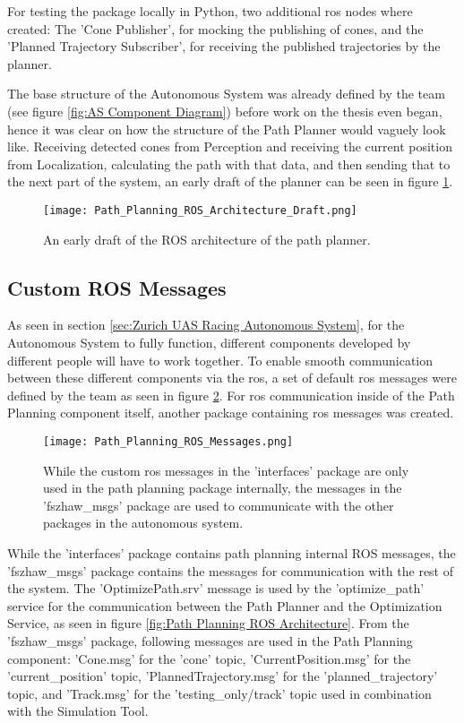 For testing the package locally in Python, two additional \acrshort{ros} nodes where created: The 'Cone Publisher', for mocking the publishing of cones, and the 'Planned Trajectory Subscriber', for receiving the published trajectories by the planner.

The base structure of the Autonomous System was already defined by the team (see figure \ref{fig:AS Component Diagram}) before work on the thesis even began, hence it was clear on how the structure of the Path Planner would vaguely look like. Receiving detected cones from Perception and receiving the current position from Localization, calculating the path with that data, and then sending that to the next part of the system, an early draft of the planner can be seen in figure \ref{fig:Path Planning ROS Architecture Draft}.
\begin{figure}[H]
    \centering
    \texttt{[image: Path\_Planning\_ROS\_Architecture\_Draft.png]}
    \caption{An early draft of the ROS architecture of the path planner.}
    \label{fig:Path Planning ROS Architecture Draft}
\end{figure}

\subsection{Custom ROS Messages} \label{sec:Custom ROS Messages}
As seen in section \ref{sec:Zurich UAS Racing Autonomous System}, for the Autonomous System to fully function, different components developed by different people will have to work together. To enable smooth communication between these different components via the \acrlong{ros}, a set of default \acrshort{ros} messages were defined by the team as seen in figure \ref{fig:Path Planning ROS Messages}. For \acrshort{ros} communication inside of the Path Planning component itself, another package containing \acrshort{ros} messages was created.
\begin{figure}[H]
    \centering
    \texttt{[image: Path\_Planning\_ROS\_Messages.png]}
    \caption{While the custom \acrshort{ros} messages in the 'interfaces' package are only used in the path planning package internally, the messages in the 'fszhaw\_msgs' package are used to communicate with the other packages in the autonomous system.}
    \label{fig:Path Planning ROS Messages}
\end{figure}
While the 'interfaces' package contains path planning internal ROS messages, the 'fszhaw\_msgs' package contains the messages for communication with the rest of the system. The 'OptimizePath.srv' message is used by the 'optimize\_path' service for the communication between the Path Planner and the Optimization Service, as seen in figure \ref{fig:Path Planning ROS Architecture}. From the 'fszhaw\_msgs' package, following messages are used in the Path Planning component: 'Cone.msg' for the 'cone' topic, 'CurrentPosition.msg' for the 'current\_position' topic, 'PlannedTrajectory.msg' for the 'planned\_trajectory' topic, and 'Track.msg' for the 'testing\_only/track' topic used in combination with the Simulation Tool.

